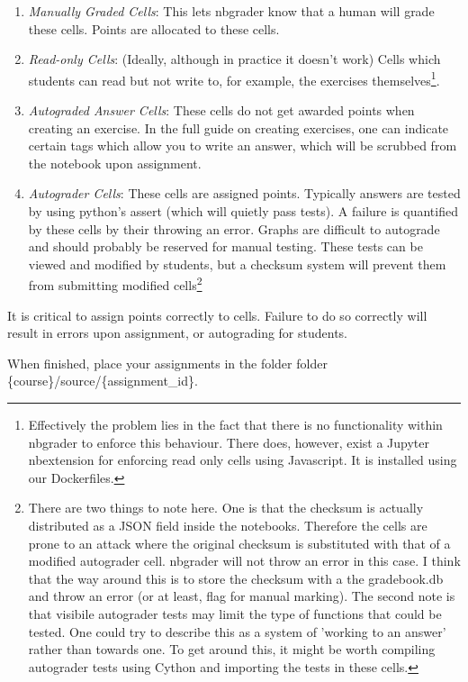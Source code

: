     \begin{enumerate}
        \item \textit{Manually Graded Cells}: This lets nbgrader know that a human will grade these cells. Points are allocated to these cells.
        \item \textit{Read-only Cells}: (Ideally, although in practice it doesn't work) Cells which students can read but not write to, for example, the exercises themselves\footnote{Effectively the problem lies in the fact that there is no functionality within nbgrader to enforce this behaviour. There does, however, exist a Jupyter nbextension for enforcing read only cells using Javascript. It is installed using our Dockerfiles.}.
        \item \textit{Autograded Answer Cells}: These cells do not get awarded points when creating an exercise. In the full guide on creating exercises, one can indicate certain tags which allow you to write an answer, which will be scrubbed from the notebook upon assignment.
        \item \textit{Autograder Cells}: These cells are assigned points. Typically answers are tested by using python's assert (which will quietly pass tests). A failure is quantified by these cells by their throwing an error. Graphs are difficult to autograde and should probably be reserved for manual testing. These tests can be viewed and modified by students, but a checksum system will prevent them from submitting modified cells\footnote{There are two things to note here. One is that the checksum is actually distributed as a JSON field inside the notebooks. Therefore the cells are prone to an attack where the original checksum is substituted with that of a modified autograder cell. nbgrader will not throw an error in this case. I think that the way around this is to store the checksum with a the gradebook.db and throw an error (or at least, flag for manual marking). The second note is that visibile autograder tests may limit the type of functions that  could be tested. One could try to describe this as a system of 'working to an answer' rather than towards one. To get around this, it might be worth compiling autograder tests using Cython and importing the tests in these cells. }
    \end{enumerate}
    
    It is critical to assign points correctly to cells. Failure to do so correctly will result in errors upon assignment, or autograding for students. 
    
    When finished, place your assignments in the folder folder \{course\}/source/\{assignment\_id\}. 
    
